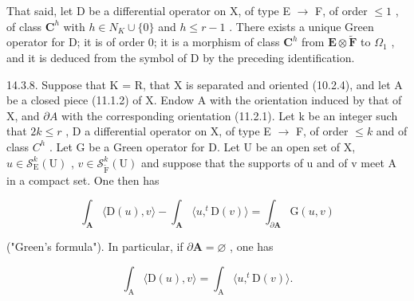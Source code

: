 That said, let D be a differential operator on X, of type E \(\to\) F, of order \(\leqslant1\) , of class \(\mathbf{C}^{h}\) with \(h \in N_{K} \cup \{0\}\) and \(h \leqslant r-1\) . There exists a unique Green operator for D; it is of order 0; it is a morphism of class \(\mathbf{C}^{h}\) from \(\mathbf{E}\otimes\widetilde{\mathbf{F}}\) to \(\Omega_{1}\) , and it is deduced from the symbol of D by the preceding identification.

14.3.8. Suppose that K = R, that X is separated and oriented (10.2.4), and let A be a closed piece (11.1.2) of X. Endow A with the orientation induced by that of X, and \(\partial A\) with the corresponding orientation (11.2.1). Let k be an integer such that \(2k \leqslant r\) , D a differential operator on X, of type E \(\to\) F, of order \(\leqslant k\) and of class \(C^{h}\) . Let G be a Green operator for D. Let U be an open set of X, \(u \in \mathcal{S}_{\mathrm{E}}^{k}(\mathrm{U})\) , \(v \in \mathcal{S}_{\widetilde{\mathrm{F}}}^{k}(\mathrm{U})\) and suppose that the supports of u and of v meet A in a compact set. One then has

\[
\int_ {\mathbf {A}} \langle \mathrm{D} (u), v \rangle - \int_ {\mathbf {A}} \langle u, ^ {t} \mathrm{D} (v) \rangle = \int_ {\partial \mathbf {A}} \mathrm{G} (u, v)
\]

("Green's formula"). In particular, if \(\partial\mathbf{A}=\varnothing\) , one has

\[
\int_ {\mathrm{A}} \langle \mathrm{D} (u), v \rangle = \int_ {\mathrm{A}} \langle u, ^ {t} \mathrm{D} (v) \rangle .
\]


